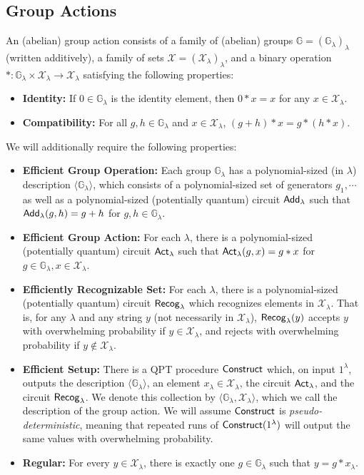 \documentclass{article}\usepackage[a4paper,margin=20mm]{geometry}
\numberwithin{theorem}{section}
\numberwithin{equation}{section}
\newcommand{\G}{\mathbb{G}}
\newcommand{\Xs}{{\mathcal{X}}}
\begin{document}
\subsection{Group Actions}\label{sec:groupactions}

An (abelian) group action consists of a family of (abelian) groups $\G=(\G_\lambda)_\lambda$ (written additively), a family of sets $\Xs=(\Xs_\lambda)_\lambda$, and a binary operation $*:\G_\lambda\times \Xs_\lambda\rightarrow \Xs_\lambda$ satisfying the following properties:
\begin{itemize}
	\item {\bf Identity:} If $0\in \G_\lambda$ is the identity element, then $0*x=x$ for any $x\in \Xs_\lambda$.
	\item {\bf Compatibility:} For all $g,h\in \G_\lambda$ and $x\in \Xs_\lambda$, $(g+h)*x=g*(h*x)$.
\end{itemize}
We will additionally require the following properties:
\begin{itemize}
	\item {\bf Efficient Group Operation:} Each group $\G_\lambda$ has a polynomial-sized (in $\lambda$) description $\langle \G_\lambda\rangle$, which consists of a polynomial-sized set of generators $g_1,\cdots$ as well as a polynomial-sized (potentially quantum) circuit ${\sf Add}_\lambda$ such that ${\sf Add}_\lambda(g,h)=g+h$ for $g,h\in\G_\lambda$. 
	\item {\bf Efficient Group Action:} For each $\lambda$, there is a polynomial-sized (potentially quantum) circuit ${\sf Act}_\lambda$ such that ${\sf Act}_\lambda(g,x)=g*x$ for $g\in\G_\lambda,x\in\Xs_\lambda$.
	\item {\bf Efficiently Recognizable Set:} For each $\lambda$, there is a polynomial-sized (potentially quantum) circuit ${\sf Recog}_\lambda$ which recognizes elements in $\Xs_\lambda$. That is, for any $\lambda$ and any string $y$ (not necessarily in $\Xs_\lambda$), ${\sf Recog}_\lambda(y)$ accepts $y$ with overwhelming probability if $y\in\Xs_\lambda$, and rejects with overwhelming probability if $y\notin\Xs_\lambda$.
	\item {\bf Efficient Setup:} There is a QPT procedure ${\sf Construct}$ which, on input $1^\lambda$, outputs the description $\langle \G_\lambda\rangle$, an element $x_\lambda\in\Xs_\lambda$, the circuit ${\sf Act}_\lambda$, and the circuit ${\sf Recog}_\lambda$. We denote this collection by $\langle\G_\lambda,\Xs_\lambda\rangle$, which we call the description of the group action. We will assume ${\sf Construct}$ is \emph{pseudo-deterministic}, meaning that repeated runs of ${\sf Construct}(1^\lambda)$ will output the same values with overwhelming probability.
	\item {\bf Regular:} For every $y\in\Xs_\lambda$, there is exactly one $g\in\G_\lambda$ such that $y=g*x_\lambda$. 
\end{itemize}
\end{document}
